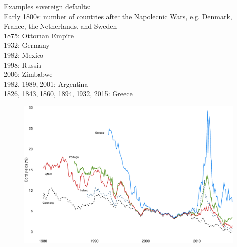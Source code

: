 \documentclass{beamer}
\begin{document}
\begin{frame}
 Examples sovereign defaults:\\
 \medskip
 Early 1800s: number of countries after the Napoleonic Wars, e.g. Denmark, France, the Netherlands, and Sweden\\
 1875: Ottoman Empire\\
 1932: Germany\\
 1982: Mexico\\
 1998: Russia\\
 2006: Zimbabwe\\
 1982, 1989, 2001: Argentina\\
 1826, 1843, 1860, 1894, 1932, 2015: Greece
\end{frame}

\begin{frame}
  \begin{figure}
      \includegraphics[scale=.3]{bonds.eps}
    \end{figure}  
\end{frame}
\end{document}
